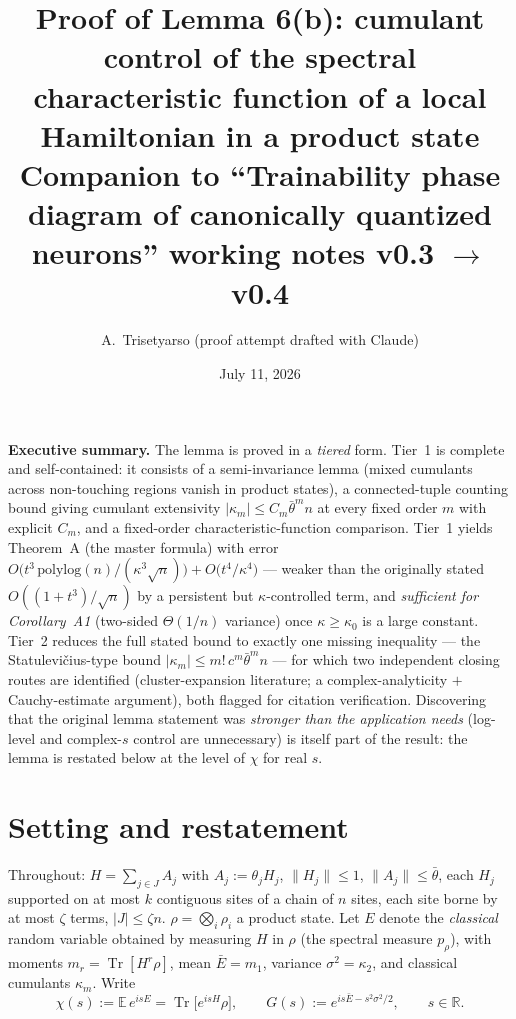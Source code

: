 \documentclass[11pt]{article}
\title{Proof of Lemma 6(b): cumulant control of the spectral characteristic
function of a local Hamiltonian in a product state\\
\large Companion to ``Trainability phase diagram of canonically quantized
neurons'' working notes v0.3 $\to$ v0.4}
\author{A.~Trisetyarso (proof attempt drafted with Claude)}
\date{July 11, 2026}
\theoremstyle{remark}
\newcommand{\Tr}{\operatorname{Tr}}
\newcommand{\Ebar}{\bar{E}}
\begin{document}
\maketitle

\noindent\textbf{Executive summary.} The lemma is proved in a \emph{tiered}
form. Tier~1 is complete and self-contained: it consists of a semi-invariance
lemma (mixed cumulants across non-touching regions vanish in product states),
a connected-tuple counting bound giving cumulant extensivity
$|\kappa_m|\le C_m\bar\theta^m n$ at every fixed order $m$ with explicit
$C_m$, and a fixed-order characteristic-function comparison. Tier~1 yields
Theorem~A (the master formula) with error
$O\!\big(t^3\,\mathrm{polylog}(n)/(\kappa^3\sqrt n)\big)+O\!\big(t^4/\kappa^4\big)$
--- weaker than the originally stated $O((1+t^3)/\sqrt n)$ by a persistent
but $\kappa$-controlled term, and \emph{sufficient for Corollary~A1}
(two-sided $\Theta(1/n)$ variance) once $\kappa\ge\kappa_0$ is a large
constant. Tier~2 reduces the full stated bound to exactly one missing
inequality --- the Statulevi\v{c}ius-type bound
$|\kappa_m|\le m!\,c^m\bar\theta^m n$ --- for which two independent closing
routes are identified (cluster-expansion literature; a complex-analyticity
$+$ Cauchy-estimate argument), both flagged for citation verification.
Discovering that the original lemma statement was \emph{stronger than the
application needs} (log-level and complex-$s$ control are unnecessary) is
itself part of the result: the lemma is restated below at the level of
$\chi$ for real $s$.

\section{Setting and restatement}

Throughout: $H=\sum_{j\in J}A_j$ with $A_j:=\theta_j H_j$, $\|H_j\|\le 1$,
$\|A_j\|\le\bar\theta$, each $H_j$ supported on at most $k$ contiguous sites
of a chain of $n$ sites, each site borne by at most $\zeta$ terms,
$|J|\le\zeta n$. $\rho=\bigotimes_i\rho_i$ a product state. Let $E$ denote the
\emph{classical} random variable obtained by measuring $H$ in $\rho$ (the
spectral measure $p_\rho$), with moments $m_r=\Tr[H^r\rho]$, mean
$\Ebar=m_1$, variance $\sigma^2=\kappa_2$, and classical cumulants
$\kappa_m$. Write
\[
\chi(s):=\mathbb{E}\,e^{isE}=\Tr\!\big[e^{isH}\rho\big],\qquad
G(s):=e^{is\Ebar-s^2\sigma^2/2},\qquad s\in\mathbb R .
\]
\end{document}
